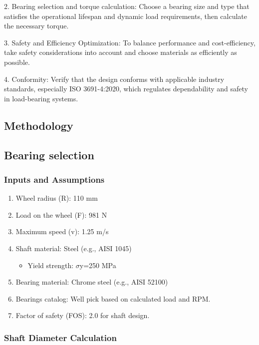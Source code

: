 \documentclass[../../main]{subfiles}
\begin{document}
2. Bearing selection and torque calculation: Choose a bearing size and
type that satisfies the operational lifespan and dynamic load
requirements, then calculate the necessary torque.

3. Safety and Efficiency Optimization: To balance performance and
cost-efficiency, take safety considerations into account and choose
materials as efficiently as possible.

4. Conformity: Verify that the design conforms with applicable industry
standards, especially ISO 3691-4:2020, which regulates dependability and
safety in load-bearing systems.

\subsection{Methodology}

\subsection{Bearing selection}

\subsubsection{Inputs and Assumptions}

\begin{enumerate}
\def\labelenumi{\arabic{enumi}.}
\item
  Wheel radius (R): 110 mm
\item
  Load on the wheel (F): 981 N
\item
  Maximum speed (v): 1.25 m/s
\item
  Shaft material: Steel (e.g., AISI 1045)

  \begin{itemize}
  \item
    Yield strength: $\sigma$y=250 MPa
  \end{itemize}
\item
  Bearing material: Chrome steel (e.g., AISI 52100)
\item
  Bearings catalog: We\textquotesingle ll pick based on
  calculated load and RPM.
\item
  Factor of safety (FOS): 2.0 for shaft design.
\end{enumerate}

\subsubsection{ Shaft Diameter Calculation}
\end{document}
